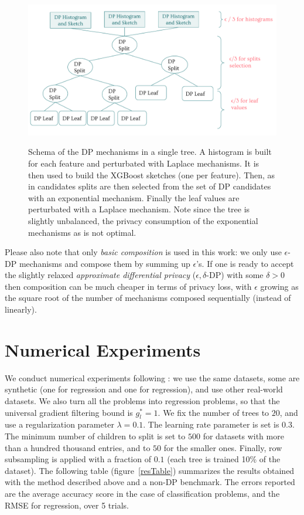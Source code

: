 \documentclass{article}
\theoremstyle{definition}
\begin{document}
\begin{figure}[h]
\centering 
\includegraphics[scale=0.7]{figs/schema_mechanisms.pdf}
\label{sketchAccuracy}
\caption{Schema of the DP mechanisms in a single tree. A histogram is built for each feature and perturbated with Laplace mechanisms.
It is then used to build the XGBoost sketches (one per feature).
Then, as in \cite{li2020privacy} candidates splits are then selected from the set of DP candidates with an exponential mechanism.
Finally the leaf values are perturbated with a Laplace mechanism.
Note since the tree is slightly unbalanced, the privacy consumption of the exponential mechanisms as is not optimal.} 
\end{figure}

Please also note that only \emph{basic composition} is used in this work: we only use $\epsilon$-DP mechanisms and compose them by summing up $\epsilon$'s.
If one is ready to accept the slightly relaxed \emph{approximate differential privacy} ($\epsilon,\delta$-DP) with some $\delta>0$ then
composition can be much cheaper in terms of privacy loss, with $\epsilon$ growing as the square root of the number of mechanisms composed sequentially (instead of linearly).

\section{Numerical Experiments}

\label{numExpSection}

We conduct numerical experiments following \cite{li2020privacy}: we use the same datasets,
some are synthetic (one for regression and one for regression), and use other real-world datasets.
We also turn all the problems into regression problems, so that the universal gradient filtering bound is $g_l^* = 1$.
We fix the number of trees to $20$, and use a regularization parameter $\lambda = 0.1$.
The learning rate parameter is set is $0.3$. The minimum number of children to split is set to $500$ for datasets with more than a hundred thousand entries,
and to $50$ for the smaller ones. Finally, row subsampling is applied with a fraction of $0.1$ (each tree is trained 10\% of the dataset).
The following table (figure~\ref{resTable}) summarizes the results obtained with the method described above and a non-DP benchmark.
The errors reported are the average accuracy score in the case of classification problems, and the RMSE for regression, over 5 trials. 
\end{document}
